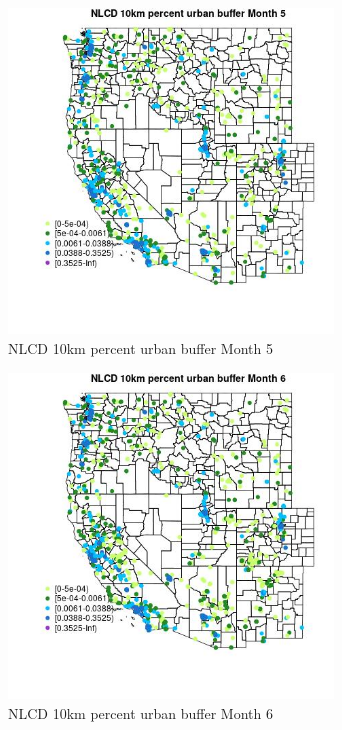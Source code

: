 \begin{figure} 
\centering  
\includegraphics[width=0.77\textwidth]{Code_Outputs/Report_ML_input_PM25_Step4_part_f_de_duplicated_aves_prioritize_24hr_obswNAs_MapObsMo5NLCD_10km_percent_urban_buffer.jpg} 
\caption{\label{fig:Report_ML_input_PM25_Step4_part_f_de_duplicated_aves_prioritize_24hr_obswNAsMapObsMo5NLCD_10km_percent_urban_buffer}NLCD 10km percent urban buffer Month 5} 
\end{figure} 
 

\begin{figure} 
\centering  
\includegraphics[width=0.77\textwidth]{Code_Outputs/Report_ML_input_PM25_Step4_part_f_de_duplicated_aves_prioritize_24hr_obswNAs_MapObsMo6NLCD_10km_percent_urban_buffer.jpg} 
\caption{\label{fig:Report_ML_input_PM25_Step4_part_f_de_duplicated_aves_prioritize_24hr_obswNAsMapObsMo6NLCD_10km_percent_urban_buffer}NLCD 10km percent urban buffer Month 6} 
\end{figure} 
 

